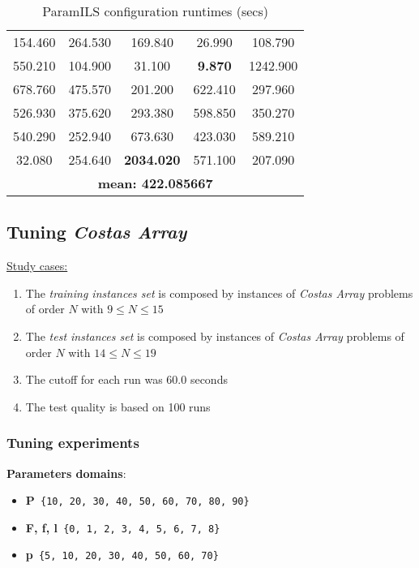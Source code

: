 \begin{table}[H]
\caption{ParamILS configuration runtimes (secs)}
\centering
\renewcommand{\arraystretch}{1.2}
\begin{tabular}{|ccccc|}
	\hline
	154.460 & 264.530 & 169.840 & 26.990 & 108.790 \\ 
	550.210 & 104.900 & 31.100 & \textcolor{naranja}{\bf 9.870} & 1242.900 \\  
	\hline 
	678.760 & 475.570 & 201.200 & 622.410 & 297.960 \\ 
	526.930 & 375.620 & 293.380 & 598.850 & 350.270 \\  
	\hline 
	540.290 & 252.940 & 673.630 & 423.030 & 589.210 \\ 
	32.080 & 254.640 & \textcolor{intenso}{\bf 2034.020} & 571.100 & 207.090 \\  
	\hline 
	\multicolumn{5}{|c|}{\bf mean: 422.085667}\\
	\hline
\end{tabular}
\label{table:testaigood}
\end{table} 

\subsection{ Tuning \textbf{\it Costas Array}}

\underline{Study cases:}
\begin{enumerate}
	\item The {\it training instances set} is composed by instances of {\it Costas Array} problems of order $N$ with $9 \leq N \leq 15$
	\item The {\it test instances set} is composed by instances of {\it Costas Array} problems of order $N$ with $14 \leq N \leq 19$
	\item The cutoff for each run was 60.0 seconds
	\item The test quality is based on 100 runs
\end{enumerate}

\subsubsection{ Tuning experiments}

{\bf Parameters domains}:

\begin{itemize}[itemsep=0.2mm]
	\item {\bf P}\texttt{ \{10, 20, 30, 40, 50, 60, 70, 80, 90\}}
	\item {\bf F, f, l}\texttt{ \{0, 1, 2, 3, 4, 5, 6, 7, 8\}}
	\item {\bf p}\texttt{ \{5, 10, 20, 30, 40, 50, 60, 70\}}
\end{itemize}

